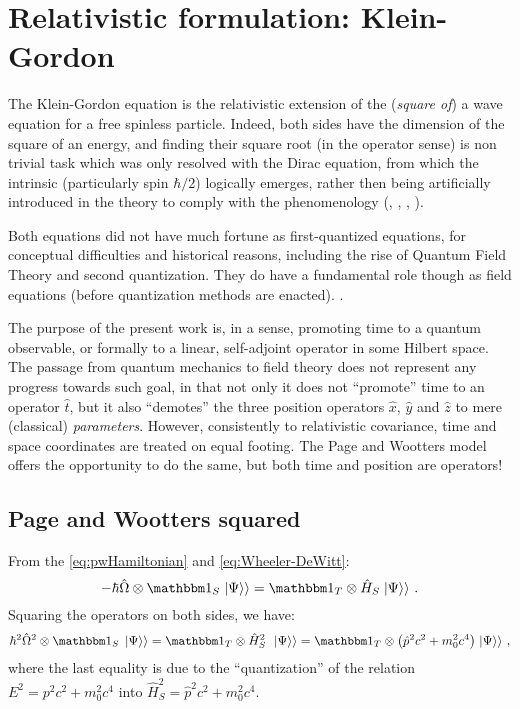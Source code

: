 \section{Relativistic formulation: Klein-Gordon}\label{sec:KG}

The Klein-Gordon equation is the relativistic extension of the
(\emph{square of}) a wave equation for a free spinless particle.
Indeed, both sides have the dimension of
the square of an energy, and finding their square root
(in the operator sense) is non trivial task which was only resolved
with the Dirac equation, from which the
intrinsic  (particularly spin $\hbar/2$) logically emerges,
rather then being artificially introduced in the theory
to comply with the phenomenology
(\cite{Greiner_Rel}, \cite[Ch. 8]{Sakurai2}, \cite{DiracEquation}, \cite[handout 2]{Webber_notes}).

Both equations did not have much fortune as first-quantized equations,
for conceptual difficulties and historical reasons, including the rise
of Quantum Field Theory and second quantization. They do have a fundamental
role though as field equations (before quantization methods are enacted).
\parencite{PeskinSchroeder}.

The purpose of the present work is, in a sense, promoting time to a quantum
observable, or formally to a linear, self-adjoint operator in some Hilbert space.
The passage from quantum mechanics to field theory does not represent any progress
towards such goal, in that not only it does not ``promote'' time to an operator $\hat{t}$,
but it also ``demotes'' the three position operators $\hat{x}$, $\hat{y}$ and $\hat{z}$
to mere (classical) \emph{parameters}. However, consistently to relativistic covariance,
time and space coordinates are treated on equal footing. The Page and Wootters model
offers the opportunity to do the same, but both time and position are operators!

\subsection{Page and Wootters squared}

From the \eqref{eq:pwHamiltonian} and \eqref{eq:Wheeler-DeWitt}:
\begin{equation}\label{eq:pw_to_be_squared}
  -\hbar\hat{\Omega}\ox\idop_S \dket{\Psi} = \idop_T\ox\hat{H}_S \dket{\Psi} \,\text{.}
\end{equation}
Squaring the operators on both sides, we have:
\begin{equation}\label{eq:pw_squared}
  \hbar^{2}\hat{\Omega}^{2}\ox\idop_S \, \dket{\Psi} = \idop_T\ox\hat{H}_S^{2} \,\, \dket{\Psi} 
    = \idop_T \ox \left( \hat{p}^2 c^2 + m_0^2 c^4 \right) \dket{\Psi} \,\text{,}
\end{equation}
where the last equality is due to the ``quantization'' of the relation $E^2 = p^2 c^2 + m_0^2 c^4$
into $\hat{H}_S^{2} = \hat{p}^2 c^2 + m_0^2 c^4$.

